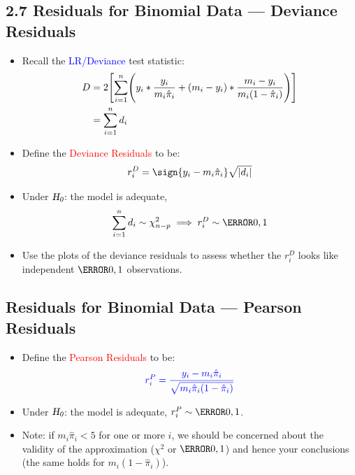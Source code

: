 \documentclass[oneside]{book}\usepackage[]{graphicx}\usepackage[svgnames]{xcolor}
\let\log\relax%
\newcommand{\HN}{\textsl{H}_{\textsl{0}}}%
\DeclarePairedDelimiter\abs{\lvert}{\rvert}
\begin{document}
\subsection*{2.7 Residuals for Binomial Data --- Deviance Residuals}
\begin{itemize}
      \item Recall the \textcolor{Blue}{LR/Deviance} test statistic:
            \begin{align*}
                  D
                   & =2\Biggl[\sum_{i=1}^{n} \Biggl(y_i\log*{\frac{y_i}{m_i\hat{\pi}_i}}+(m_i-y_i)\log*{\frac{m_i-y_i}{m_i(1-\hat{\pi}_i)}}\Biggr)\Biggr] \\
                   & =\sum_{i=1}^{n} d_i
            \end{align*}
      \item Define the \textcolor{Red}{Deviance Residuals} to be:
            \[ r_i^D=\sign{y_i-m_i\hat{\pi}_i}\sqrt{\abs{d_i}} \]
      \item Under $ \HN $: the model is adequate,
            \[ \sum_{i=1}^{n} d_i \sim \chi^2_{n-p}\implies r_i^D \sim \N{0,1} \]
      \item Use the plots of the deviance residuals to assess whether the $ r_i^D $ looks like independent $ \N{0,1} $ observations.
\end{itemize}
\subsection*{Residuals for Binomial Data --- Pearson Residuals}
\begin{itemize}
      \item Define the \textcolor{Red}{Pearson Residuals} to be:
            \[ \textcolor{Blue}{r_i^P=\frac{y_i-m_i\hat{\pi}_i}{\sqrt{m_i\hat{\pi}_i(1-\hat{\pi}_i)}}} \]
      \item Under $ \HN $: the model is adequate,
            $ r_i^P \sim \N{0,1} $.
      \item Note: if $ m_i\hat{\pi}_i<5 $ for one or more $ i $, we should be concerned about the validity of
            the approximation ($ \chi^2 $ or $ \N{0,1} $) and hence your conclusions (the same holds for $ m_i(1-\hat{\pi}_i) $).
\end{itemize}
\end{document}
